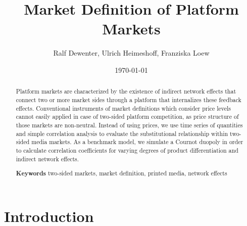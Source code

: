 \documentclass[12pt,a4paper,notitlepage]{article}
\title{Market Definition of Platform Markets}
\date{\today}
\author{Ralf Dewenter, Ulrich Heimeshoff, Franziska Loew}
\begin{document}
\begin{titlepage}
	\maketitle
	\begin{abstract}
	
	Platform markets are characterized by the existence of indirect network effects that connect two or more market sides through a platform that internalizes these feedback effects. Conventional instruments of market definitions which consider price levels cannot easily applied in case of two-sided platform competition, as price structure of those markets are non-neutral. Instead of using prices, we use time series of quantities and simple correlation analysis to evaluate the substitutional relationship within two-sided media markets. As a benchmark model, we simulate a Cournot duopoly in order to calculate correlation coefficients for varying degrees of product differentiation and indirect network effects.
		
		\textbf{Keywords} two-sided markets, market definition, printed media, network effects

	\end{abstract}

\end{titlepage}


\section{Introduction}
\end{document}

